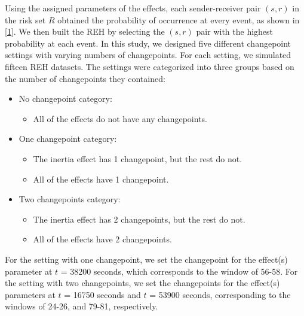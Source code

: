 \documentclass[]{interact}
\theoremstyle{plain}%
\theoremstyle{definition}
\theoremstyle{remark}
\begin{document}
{	Using the assigned parameters of the effects, each sender-receiver pair $(s,r)$ in the risk set $R$ obtained the probability of occurrence at every event, as shown in \autoref{1}. We then built the REH by selecting the $(s,r)$ pair with the highest probability at each event. In this study, we designed five different changepoint settings with varying numbers of changepoints. For each setting, we simulated fifteen REH datasets. The settings were categorized into three groups based on the number of changepoints they contained:
	
    \begin{itemize} \label{data cate}
    	\item No changepoint category:
    	\begin{itemize}
    		\item All of the effects do not have any changepoints. \\
    	\end{itemize}
    	\item One changepoint category:
    	\begin{itemize}
    		\item The inertia effect has 1 changepoint, but the rest do not.
    		\item All of the effects have 1 changepoint. \\
    	\end{itemize}
    	\item Two changepoints category:
    	\begin{itemize}
    		\item The inertia effect has 2 changepoints, but the rest do not.
    		\item All of the effects have 2 changepoints.
    	\end{itemize}
    \end{itemize}

    For the setting with one changepoint, we set the changepoint for the effect(s) parameter at $t$ = 38200 seconds, which corresponds to the window of 56-58. For the setting with two changepoints, we set the changepoints for the effect(s) parameters at $t$ = 16750 seconds and $t$ = 53900 seconds, corresponding to the windows of 24-26, and 79-81, respectively.

}
\end{document}
